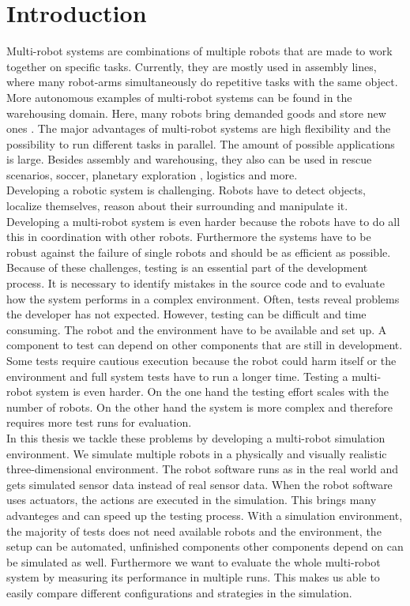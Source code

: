 \section{Introduction}

Multi-robot systems are combinations of multiple robots that are made to work together on specific tasks. Currently, they are mostly used in assembly lines, where many robot-arms simultaneously do repetitive tasks with the same object. More autonomous examples of multi-robot systems can be found in the warehousing domain. Here, many robots bring demanded goods and store new ones \cite{Kiva}. The major advantages of multi-robot systems are high flexibility and the possibility to run different tasks in parallel. The amount of possible applications is large. Besides assembly and warehousing, they also can be used in rescue scenarios\cite{mas_rescue}, soccer\cite{mas_soccer}, planetary exploration \cite{mas_space}, logistics and more.\\
Developing a robotic system is challenging. Robots have to detect objects, localize themselves, reason about their surrounding and manipulate it. Developing a multi-robot system is even harder because the robots have to do all this in coordination with other robots. Furthermore the systems have to be robust against the failure of single robots and should be as efficient as possible. Because of these challenges, testing is an essential part of the development process. It is necessary to identify mistakes in the source code and to evaluate how the system performs in a complex environment. Often, tests reveal problems the developer has not expected. However, testing can be difficult and time consuming. The robot and the environment have to be available and set up. A component to test can depend on other components that are still in development. Some tests require cautious execution because the robot could harm itself or the environment and full system tests have to run a longer time. Testing a multi-robot system is even harder. On the one hand the testing effort scales with the number of robots. On the other hand the system is more complex and therefore requires more test runs for evaluation.\\
In this thesis we tackle these problems by developing a multi-robot simulation environment. We simulate multiple robots in a physically and visually realistic three-dimensional environment. The robot software runs as in the real world and gets simulated sensor data instead of real sensor data. When the robot software uses actuators, the actions are executed in the simulation. This brings many advanteges and can speed up the testing process. With a simulation environment, the majority of tests does not need available robots and the environment, the setup can be automated, unfinished components other components depend on can be simulated as well. Furthermore we want to evaluate the whole multi-robot system by measuring its performance in multiple runs. This makes us able to easily compare different configurations and strategies in the simulation.\\
